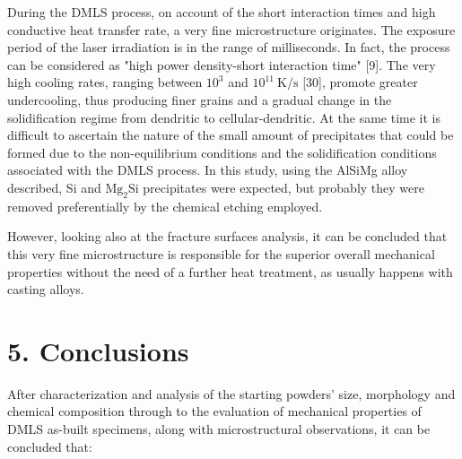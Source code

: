 \documentclass[10pt]{article}
\begin{document}
During the DMLS process, on account of the short interaction times and high conductive heat transfer rate, a very fine microstructure originates. The exposure period of the laser irradiation is in the range of milliseconds. In fact, the process can be considered as "high power density-short interaction time" [9]. The very high cooling rates, ranging between $10^{3}$ and $10^{11} \mathrm{~K} / \mathrm{s}$ [30], promote greater undercooling, thus producing finer grains and a gradual change in the solidification regime from dendritic to cellular-dendritic. At the same time it is difficult to ascertain the nature of the small amount of precipitates that could be formed due to the non-equilibrium conditions and the solidification conditions associated with the DMLS process. In this study, using the AlSiMg alloy described, Si and $\mathrm{Mg}_{2} \mathrm{Si}$ precipitates were expected, but probably they were removed preferentially by the chemical etching employed.

However, looking also at the fracture surfaces analysis, it can be concluded that this very fine microstructure is responsible for the superior overall mechanical properties without the need of a further heat treatment, as usually happens with casting alloys.

\section*{5. Conclusions}
After characterization and analysis of the starting powders' size, morphology and chemical composition through to the evaluation of mechanical properties of DMLS as-built specimens, along with microstructural observations, it can be concluded that:
\end{document}
